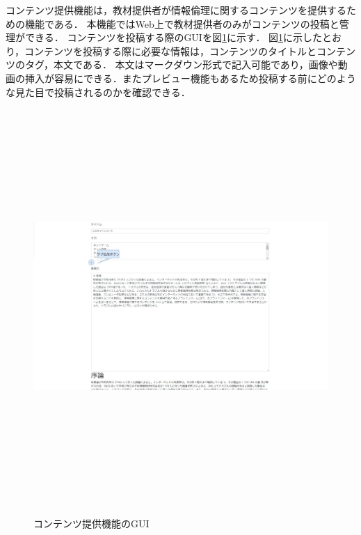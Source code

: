 コンテンツ提供機能は，教材提供者が情報倫理に関するコンテンツを提供するための機能である．
本機能ではWeb上で教材提供者のみがコンテンツの投稿と管理ができる．
コンテンツを投稿する際のGUIを図\ref{content_teikyou}に示す．
図\ref{content_teikyou}に示したとおり，コンテンツを投稿する際に必要な情報は，コンテンツのタイトルとコンテンツのタグ，本文である．
本文はマークダウン形式で記入可能であり，画像や動画の挿入が容易にできる．またプレビュー機能もあるため投稿する前にどのような見た目で投稿されるのかを確認できる．

\begin{figure}[htbp]
    \begin{center}
        \includegraphics[width=16cm,height=15cm,keepaspectratio]{content_teikyou-crop.pdf}\\
    \end{center}
    \caption{コンテンツ提供機能のGUI}
    \label{content_teikyou}
\end{figure}

